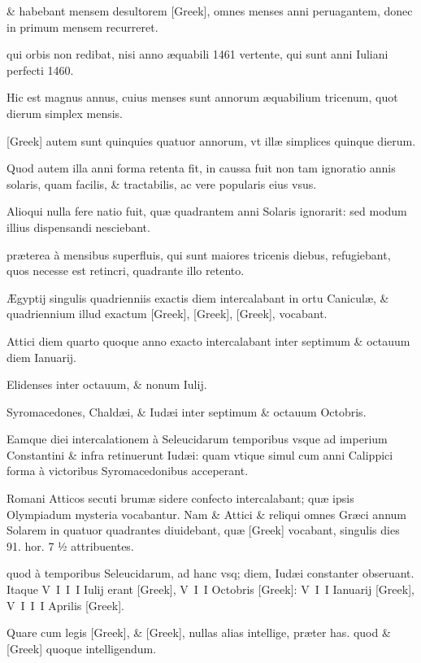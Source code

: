 \begin{parnumbers}

\& habebant mensem desultorem  \textgreek{[Greek]}, omnes menses anni peruagantem, donec in primum mensem recurreret.

qui orbis non redibat, nisi anno æquabili 1461 vertente, qui sunt anni Iuliani perfecti 1460.

Hic est magnus annus, cuius menses sunt annorum æquabilium tricenum, quot dierum simplex mensis.

\textgreek{[Greek]} autem sunt quinquies quatuor annorum, vt illæ simplices quinque dierum.

Quod autem illa anni forma retenta fit, in caussa fuit non tam ignoratio annis solaris, quam facilis, \& tractabilis, ac vere popularis eius vsus.

Alioqui nulla fere natio fuit, quæ quadrantem anni Solaris ignorarit: sed modum illius dispensandi nesciebant.

præterea à mensibus superfluis, qui sunt maiores tricenis diebus, refugiebant, quos necesse est retincri, quadrante illo retento. 

Ægyptij singulis quadrienniis exactis diem intercalabant in ortu Caniculæ, \& quadriennium illud exactum \textgreek{[Greek]}, \textgreek{[Greek]}, \textgreek{[Greek]}, vocabant.

Attici diem quarto quoque anno exacto intercalabant inter septimum \& octauum diem Ianuarij.

Elidenses inter octauum, \& nonum Iulij.

Syromacedones, Chaldæi, \& Iudæi inter septimum \& octauum Octobris.

Eamque diei intercalationem à Seleucidarum temporibus vsque ad imperium Constantini \& infra retinuerunt Iudæi: quam vtique simul cum anni Calippici forma à victoribus Syromacedonibus acceperant.

Romani Atticos secuti brumæ sidere confecto intercalabant; quæ ipsis Olympiadum mysteria vocabantur. Nam \& Attici \& reliqui omnes Græci annum Solarem in  quatuor quadrantes diuidebant, quæ \textgreek{[Greek]} vocabant, singulis dies 91. hor. 7 ½ attribuentes.

quod à temporibus Seleucidarum, ad hanc vsq; diem, Iudæi constanter obseruant. Itaque V I I I Iulij erant \textgreek{[Greek]}, V I I Octobris \textgreek{[Greek]}: V I I Ianuarij \textgreek{[Greek]}, V I I I Aprilis \textgreek{[Greek]}.

Quare cum legis \textgreek{[Greek]}, \& \textgreek{[Greek]}, nullas alias intellige, præter has. quod \& \textgreek{[Greek]} quoque intelligendum.


\end{parnumbers}

